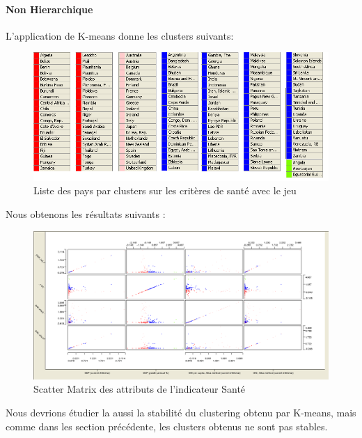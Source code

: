 \paragraph{Non Hierarchique}
L'application de K-means donne les clusters suivants: 

\begin{figure}[H]
	\begin{center}
		\includegraphics[scale=0.5]{Image/TableViewPolitiqueKmeansNomissing2}
		\caption{Liste des pays par clusters sur les critères de santé avec le jeu \jeuc}
	\end{center}
\end{figure}


Nous obtenons les résultats suivants : 

\begin{figure}[H]
	\begin{center}
		\includegraphics[scale=0.5]{Image/scattermatrixPolitiquekmeansNoMissing2}
		\caption{Scatter Matrix des attributs de l'indicateur Santé \jeuc}
	\end{center}
\end{figure}

Nous devrions étudier la aussi la stabilité du clustering obtenu par K-means, mais comme dans les section précédente, les clusters obtenus ne sont pas stables.

